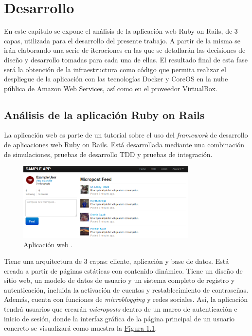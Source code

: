 \chapter{Desarrollo}
\label{cha:development}

En este capítulo se expone el análisis de la aplicación web Ruby on Rails, de 3 capas, utilizada para el desarrollo del presente trabajo. A partir de la misma se irán elaborando una serie de iteraciones en las que se detallarán las decisiones de diseño y desarrollo tomadas para cada una de ellas. El resultado final de esta fase será la obtención de la infraestructura como código que permita realizar el despliegue de la aplicación con las tecnologías Docker y CoreOS en la nube pública de Amazon Web Services, así como en el proveedor VirtualBox.

\section{Análisis de la aplicación Ruby on Rails}

La aplicación web  es parte de un tutorial\cite{rubytutorial} sobre el uso del \textit{framework} de desarrollo de aplicaciones web Ruby on Rails. Está desarrollada mediante una combinación de simulaciones, pruebas de desarrollo TDD y pruebas de integración. 

\begin{figure}[H]
\centering
\includegraphics[width=0.8\textwidth]{images/figures/sampleapp.png}
\caption{Aplicación web . \label{fig:sampleapp}}
\end{figure}

Tiene una arquitectura de 3 capas: cliente, aplicación y base de datos. Está creada a partir de páginas estáticas con contenido dinámico. Tiene un diseño de sitio web, un modelo de datos de usuario y un sistema completo de registro y autenticación, incluida la activación de cuentas y restablecimiento de contraseñas. Además, cuenta con funciones de \textit{microblogging} y redes sociales. Así, la aplicación tendrá usuarios que crearán \textit{microposts} dentro de un marco de autenticación e inicio de sesión, donde la interfaz gráfica de la página principal de un usuario concreto se visualizará como muestra la \hyperref[fig:sampleapp]{Figura \ref{fig:sampleapp}}.

